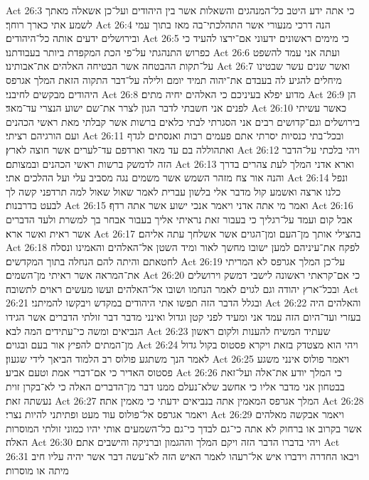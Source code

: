 Act 26:3  כי אתה ידע היטב כל־המנהגים והשאלות אשר בין היהודים ועל־כן אשאלה מאתך לשמע אתי כארך רוחך׃
Act 26:4  הנה דרכי מנעורי אשר התהלכתי־בה מאז בתוך עמי ובירושלים ידעים אותה כל־היהודים׃
Act 26:5  כי מימים ראשונים ידעוני אם־ירצו להעיד כי כפרוש התנהגתי על־פי הכת המקפדת ביותר בעבודתנו׃
Act 26:6  ועתה אני עמד להשפט על־תקות ההבטחה אשר הבטיחה האלהים את־אבותינו׃
Act 26:7  ואשר שנים עשר שבטינו מיחלים להגיע לה בעבדם את־יהוה תמיד יומם ולילה על־דבר התקוה הזאת המלך אגרפס היהודים מבקשים לחיבני׃
Act 26:8  מדוע יפלא בעיניכם כי האלהים יחיה מתים׃
Act 26:9  הן לפנים אני חשבתי לדבר הגון לצרר את־שם ישוע הנצרי עד־מאד׃
Act 26:10  כאשר עשיתי בירושלים וגם־קדושים רבים אני הסגרתי לבתי כלאים ברשות אשר קבלתי מאת ראשי הכהנים ועם הורגיהם רציתי׃
Act 26:11  ובכל־בתי כנסיות יסרתי אתם פעמים רבות ואנסתים לגדף ואתהוללה בם עד מאד וארדפם עד־לערים אשר חוצה לארץ׃
Act 26:12  ויהי בלכתי על־הדבר הזה לדמשק ברשות ראשי הכהנים ובמצותם׃
Act 26:13  וארא אדני המלך לעת צהרים בדרך והנה אור צח מזהר השמש אשר משמים נגה מסביב עלי ועל ההלכים אתי׃
Act 26:14  ונפל כלנו ארצה ואשמע קול מדבר אלי בלשון עברית לאמר שאול שאול למה תרדפני קשה לך לבעט בדרבנות׃
Act 26:15  ואמר מי אתה אדני ויאמר אנכי ישוע אשר אתה רדף׃
Act 26:16  אבל קום ועמד על־רגליך כי בעבור זאת נראיתי אליך בעבור אבחר בך למשרת ולעד הדברים אשר ראית ואשר ארא׃
Act 26:17  בהצילי אותך מן־העם ומן־הגוים אשר אשלחך עתה אליהם׃
Act 26:18  לפקח את־עיניהם למען ישובו מחשך לאור ומיד השטן אל־האלהים והאמינו ונסלח לחטאתם והיתה להם הנחלה בתוך המקדשים׃
Act 26:19  על־כן המלך אגרפס לא המריתי את־המראה אשר ראיתי מן־השמים׃
Act 26:20  כי אם־קראתי ראשונה לישבי דמשק וירושלים ובכל־ארץ יהודה וגם לגוים לאמר הנחמו ושובו אל־האלהים ועשו מעשים ראוים לתשובה׃
Act 26:21  ובגלל הדבר הזה תפשו אתי היהודים במקדש ויבקשו להמיתני׃
Act 26:22  והאלהים היה בעזרי ועד־היום הזה עמד אני ומעיד לפני קטן וגדול ואינני מדבר דבר זולתי הדברים אשר הגידו הנביאים ומשה כי־עתידים המה לבא׃
Act 26:23  שעתיד המשיח להענות ולקום ראשון מן־המתים להפיץ אור בעם ובגוים׃
Act 26:24  ויהי הוא מצטדק בזאת ויקרא פסטוס בקול גדול לאמר הנך משתגע פולוס רב הלמוד הביאך לידי שגעון׃
Act 26:25  ויאמר פולוס אינני משגע פסטוס האדיר כי אם־דברי אמת וטעם אביע׃
Act 26:26  כי המלך יודע את־אלה ועל־זאת בבטחון אני מדבר אליו כי אחשב שלא־נעלם ממנו דבר מן־הדברים האלה כי לא־בקרן זוית נעשתה זאת׃
Act 26:27  המלך אגרפס המאמין אתה בנביאים ידעתי כי מאמין אתה׃
Act 26:28  ויאמר אגרפס אל־פולוס עוד מעט ופתיתני להיות נצרי׃
Act 26:29  ויאמר אבקשה מאלהים אשר בקרוב או ברחוק לא אתה כי־גם לבדך כי־גם כל־השמעים אותי יהיו כמוני זולתי המוסרות האלה׃
Act 26:30  ויהי בדברו הדבר הזה ויקם המלך וההגמון וברניקה והישבים אתם׃
Act 26:31  ויבאו החדרה וידברו איש אל־רעהו לאמר האיש הזה לא־עשה דבר אשר יהיה עליו חיב מיתה או מוסרות׃
